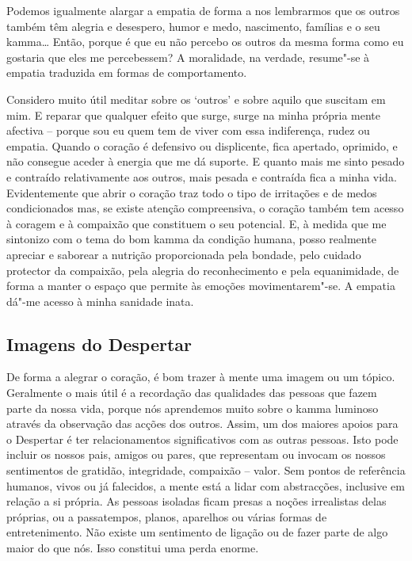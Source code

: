 Podemos igualmente alargar a empatia de forma a nos lembrarmos que os outros
também têm alegria e desespero, humor e medo, nascimento, famílias e o seu
kamma\ldots{} Então, porque é que eu não percebo os outros da mesma forma como
eu gostaria que eles me percebessem? A moralidade, na verdade, resume"-se à
empatia traduzida em formas de comportamento.

Considero muito útil meditar sobre os `outros' e sobre aquilo que suscitam em
mim. E reparar que qualquer efeito que surge, surge na minha própria mente
afectiva -- porque sou eu quem tem de viver com essa indiferença, rudez ou
empatia. Quando o coração é defensivo ou displicente, fica apertado, oprimido, e
não consegue aceder à energia que me dá suporte. E quanto mais me sinto pesado e
contraído relativamente aos outros, mais pesada e contraída fica a minha vida.
Evidentemente que abrir o coração traz todo o tipo de irritações e de medos
condicionados mas, se existe atenção compreensiva, o coração também tem acesso à
coragem e à compaixão que constituem o seu potencial. E, à medida que me
sintonizo com o tema do bom kamma da condição humana, posso realmente apreciar e
saborear a nutrição proporcionada pela bondade, pelo cuidado protector da
compaixão, pela alegria do reconhecimento e pela equanimidade, de forma a manter
o espaço que permite às emoções movimentarem"-se. A empatia dá"-me acesso à minha
sanidade inata.

\subsection{Imagens do Despertar}

De forma a alegrar o coração, é bom trazer à mente uma imagem ou um tópico.
Geralmente o mais útil é a recordação das qualidades das pessoas que fazem parte
da nossa vida, porque nós aprendemos muito sobre o kamma luminoso através da
observação das acções dos outros. Assim, um dos maiores apoios para o Despertar
é ter relacionamentos significativos com as outras pessoas. Isto pode incluir os
nossos pais, amigos ou pares, que representam ou invocam os nossos sentimentos
de gratidão, integridade, compaixão -- valor. Sem pontos de referência humanos,
vivos ou já falecidos, a mente está a lidar com abstracções, inclusive em
relação a si própria. As pessoas isoladas ficam presas a noções irrealistas
delas próprias, ou a passatempos, planos, aparelhos ou várias formas de
entretenimento. Não existe um sentimento de ligação ou de fazer parte de algo
maior do que nós. Isso constitui uma perda enorme.

